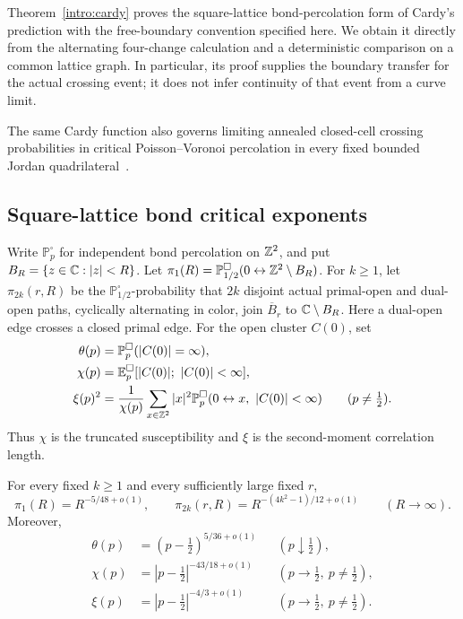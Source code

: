 Theorem~\ref{intro:cardy} proves the square-lattice bond-percolation form
of Cardy's prediction with the free-boundary convention specified here.
We obtain it directly from the alternating four-change calculation and
a deterministic comparison on a common lattice graph.  In particular,
its proof supplies the boundary transfer for the actual crossing event;
it does not infer continuity of that event from a curve limit.

The same Cardy function also governs limiting annealed closed-cell crossing
probabilities in critical Poisson--Voronoi percolation in every fixed
bounded Jordan quadrilateral~\citep[Theorem~1.1]{OpenAIVoronoiCardy2026}.

\subsection{Square-lattice bond critical exponents}
\label{intro:percolation-exponents}

Write $\mathbb P_p^\square$ for independent bond percolation on $\mathbb Z^2$,
and put $B_R=\{z\in\mathbb C:|z|<R\}$.  Let
$\pi_1(R)=\mathbb P_{1/2}^\square(0\leftrightarrow\mathbb Z^2\setminus B_R)$.
For $k\ge1$, let $\pi_{2k}(r,R)$ be the $\mathbb P_{1/2}^\square$-probability
that $2k$ disjoint
actual primal-open and dual-open paths, cyclically alternating in
color, join $\overline B_r$ to $\mathbb C\setminus B_R$.  Here a dual-open
edge crosses a closed primal edge.  For the open cluster $C(0)$, set
\begin{align*}
 \theta(p)&=\mathbb P_p^\square(|C(0)|=\infty),\\
 \chi(p)&=\mathbb E_p^\square[|C(0)|;\ |C(0)|<\infty],\\
 \xi(p)^2&=\frac{1}{\chi(p)}
   \sum_{x\in\mathbb Z^2}|x|^2
   \mathbb P_p^\square(0\leftrightarrow x,\ |C(0)|<\infty)
   \qquad(p\ne\tfrac12).
\end{align*}
Thus $\chi$ is the truncated susceptibility and $\xi$ is the
second-moment correlation length.

\begin{corollary}
\label{intro:bond-exponents}
For every fixed $k\ge1$ and every sufficiently large fixed $r$,
\begin{equation}\label{intro:bond-arm-exponents}
 \pi_1(R)=R^{-5/48+o(1)},\qquad
 \pi_{2k}(r,R)=R^{-(4k^2-1)/12+o(1)}
 \qquad(R\to\infty).
\end{equation}
Moreover,
\begin{equation}\label{intro:bond-thermodynamic-exponents}
\begin{aligned}
 \theta(p)&=(p-\tfrac12)^{5/36+o(1)}
   &&(p\downarrow\tfrac12),\\
 \chi(p)&=|p-\tfrac12|^{-43/18+o(1)}
   &&(p\to\tfrac12,\ p\ne\tfrac12),\\
 \xi(p)&=|p-\tfrac12|^{-4/3+o(1)}
   &&(p\to\tfrac12,\ p\ne\tfrac12).
\end{aligned}
\end{equation}
\end{corollary}

